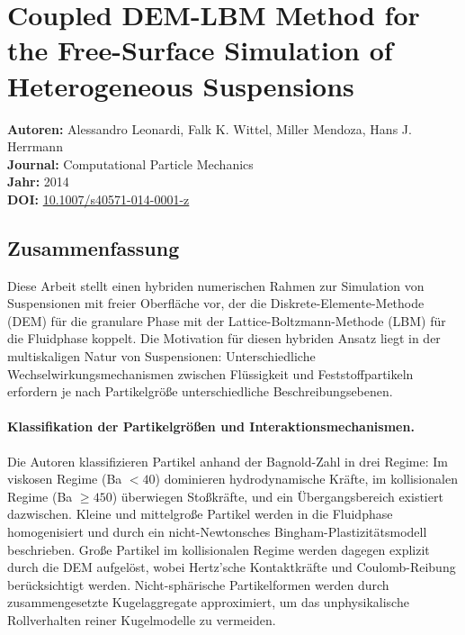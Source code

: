 \documentclass[a4paper,12pt]{article}
\begin{document}
\section*{Coupled DEM-LBM Method for the Free-Surface Simulation of Heterogeneous Suspensions}
\textbf{Autoren:} Alessandro Leonardi, Falk K. Wittel, Miller Mendoza, Hans J. Herrmann \\
\textbf{Journal:} Computational Particle Mechanics \\
\textbf{Jahr:} 2014 \\
\textbf{DOI:} \href{https://doi.org/10.1007/s40571-014-0001-z}{10.1007/s40571-014-0001-z}

\subsection*{Zusammenfassung}

Diese Arbeit stellt einen hybriden numerischen Rahmen zur Simulation von Suspensionen mit freier Oberfläche vor, der die Diskrete-Elemente-Methode (DEM) für die granulare Phase mit der Lattice-Boltzmann-Methode (LBM) für die Fluidphase koppelt. Die Motivation für diesen hybriden Ansatz liegt in der multiskaligen Natur von Suspensionen: Unterschiedliche Wechselwirkungsmechanismen zwischen Flüssigkeit und Feststoffpartikeln erfordern je nach Partikelgröße unterschiedliche Beschreibungsebenen.

\paragraph{Klassifikation der Partikelgrößen und Interaktionsmechanismen.}
Die Autoren klassifizieren Partikel anhand der Bagnold-Zahl in drei Regime: Im viskosen Regime (Ba $< 40$) dominieren hydrodynamische Kräfte, im kollisionalen Regime (Ba $\geq 450$) überwiegen Stoßkräfte, und ein Übergangsbereich existiert dazwischen. Kleine und mittelgroße Partikel werden in die Fluidphase homogenisiert und durch ein nicht-Newtonsches Bingham-Plastizitätsmodell beschrieben. Große Partikel im kollisionalen Regime werden dagegen explizit durch die DEM aufgelöst, wobei Hertz'sche Kontaktkräfte und Coulomb-Reibung berücksichtigt werden. Nicht-sphärische Partikelformen werden durch zusammengesetzte Kugelaggregate approximiert, um das unphysikalische Rollverhalten reiner Kugelmodelle zu vermeiden.
\end{document}
